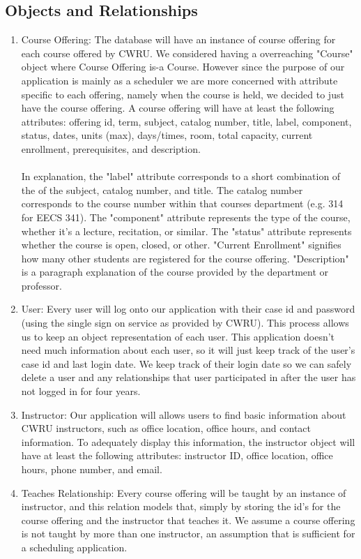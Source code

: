 \documentclass[pdftex,12pt,letter]{article}
\begin{document}
\subsection*{Objects and Relationships}
\begin{enumerate}[1.]
\item Course Offering: The database will have an instance of course offering for each course offered by CWRU. We considered having a overreaching "Course" object where Course Offering is-a Course. However since the purpose of our application is mainly as a scheduler we are more concerned with attribute specific to each offering, namely when the course is held, we decided to just have the course offering. A course offering will have at least the following attributes: offering id, term, subject, catalog number, title, label, component, status, dates, units (max), days/times, room, total capacity, current enrollment, prerequisites, and description.\\\\ In explanation, the "label" attribute corresponds to a short combination of the of the subject, catalog number, and title. The catalog number corresponds to the course number within that courses department (e.g. 314 for EECS 341). The "component" attribute represents the type of the course, whether it's a lecture, recitation, or similar. The "status" attribute represents whether the course is  open, closed, or other. "Current Enrollment" signifies how many other students are registered for the course offering. "Description" is a paragraph explanation of the course provided by the department or professor.
\item User: Every user will log onto our application with their case id and password (using the single sign on service as provided by CWRU). This process allows us to keep an object representation of each user. This application doesn't need much information about each user, so it will just keep track of the user's case id and last login date. We keep track of their login date so we can safely delete a user and any relationships that user participated in after the user has not logged in for four years.
\item Instructor: Our application will allows users to find basic information about CWRU instructors, such as office location, office hours, and contact information. To adequately display this information, the instructor object will have at least the following attributes: instructor ID, office location, office hours, phone number, and email.
\item Teaches Relationship: Every course offering will be taught by an instance of instructor, and this relation models that, simply by storing the id's for the course offering and the instructor that teaches it. We assume a course offering is not taught by more than one instructor, an assumption that is sufficient for a scheduling application.

\end{enumerate}
\end{document}

